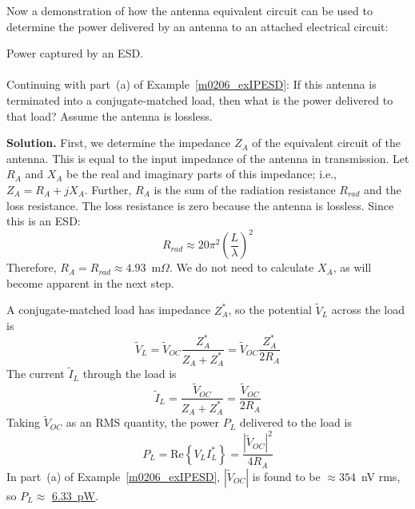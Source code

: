 Now a demonstration of how the antenna equivalent circuit can be used to determine the power delivered by an antenna to an attached electrical circuit:
%
~\\ \begin{example} 
\begin{mdframed}[backgroundcolor=brown!20,linecolor=brown!20]\raggedright
Power captured by an ESD.
\\~\\
Continuing with part~(a) of Example~\ref{m0206_exIPESD}:
If this antenna is terminated into a conjugate-matched load, then what is the power delivered to that load?
Assume the antenna is lossless.

{\bf Solution.}
First, we determine the impedance $Z_A$ of the equivalent circuit of the antenna.  
This is equal to the input impedance of the antenna in transmission.
Let $R_A$ and $X_A$ be the real and imaginary parts of this impedance; i.e., $Z_A=R_A+jX_A$.
Further, $R_A$ is the sum of the radiation resistance $R_{rad}$ and the loss resistance.
The loss resistance is zero because the antenna is lossless.
Since this is an ESD:
%
\begin{equation}
R_{rad} \approx 20\pi^2 \left(\frac{L}{\lambda}\right)^2
\end{equation}
%
Therefore, $R_A = R_{rad}\approx 4.93$~m$\Omega$.
We do not need to calculate $X_A$, as will become apparent in the next step.

A conjugate-matched load has impedance $Z_A^*$, so the potential $\widetilde{V}_L$ across the load is 
%
\begin{equation}
\widetilde{V}_L = \widetilde{V}_{OC}\frac{Z_A^*}{Z_A+Z_A^*} = \widetilde{V}_{OC}\frac{Z_A^*}{2R_A}
\end{equation}
%
The current $\widetilde{I}_L$ through the load is 
%
\begin{equation}
\widetilde{I}_L = \frac{\widetilde{V}_{OC}}{Z_A+Z_A^*} = \frac{\widetilde{V}_{OC}}{2R_A}
\end{equation}
%
Taking $\widetilde{V}_{OC}$ as an RMS quantity, the power $P_L$ delivered to the load is
%
\begin{equation}
P_L = \mbox{Re}\left\{V_L I_L^*\right\} 
    = \frac{\left|\widetilde{V}_{OC}\right|^2}{4R_A} 
\end{equation}
%
In part~(a) of Example~\ref{m0206_exIPESD}, $\left|\widetilde{V}_{OC}\right|$ is found to be $\approx 354$~nV rms, so 
$P_L \approx$ \underline{6.33~pW}.

\end{mdframed}
\end{example}

